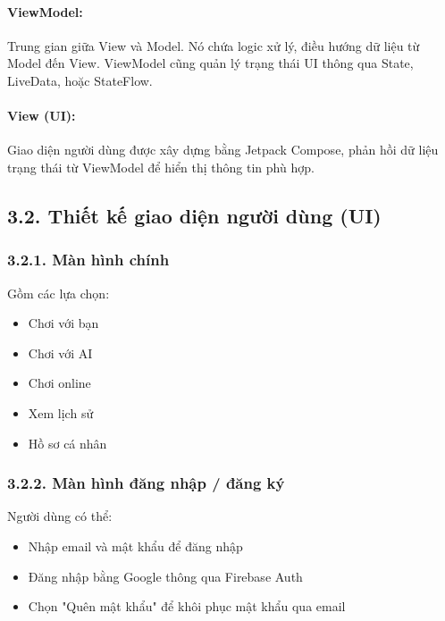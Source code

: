 \documentclass[a4paper,12pt]{article}
\begin{document}
\paragraph{ViewModel:} %
\noindent Trung gian giữa View và Model. Nó chứa logic xử lý, điều hướng dữ liệu từ Model đến View. ViewModel cũng quản lý trạng thái UI thông qua State, LiveData, hoặc StateFlow.

\paragraph{View (UI):} %
\noindent Giao diện người dùng được xây dựng bằng Jetpack Compose, phản hồi dữ liệu trạng thái từ ViewModel để hiển thị thông tin phù hợp.

\subsection*{3.2. Thiết kế giao diện người dùng (UI)} %

\subsubsection*{3.2.1. Màn hình chính} %

\noindent Gồm các lựa chọn:
\begin{itemize}[label=·]
    \item Chơi với bạn
    \item Chơi với AI
    \item Chơi online
    \item Xem lịch sử
    \item Hồ sơ cá nhân
\end{itemize}

\subsubsection*{3.2.2. Màn hình đăng nhập / đăng ký} %

\noindent Người dùng có thể:
\begin{itemize}[label=·]
    \item Nhập email và mật khẩu để đăng nhập
    \item Đăng nhập bằng Google thông qua Firebase Auth
    \item Chọn "Quên mật khẩu" để khôi phục mật khẩu qua email
\end{itemize}
\end{document}
